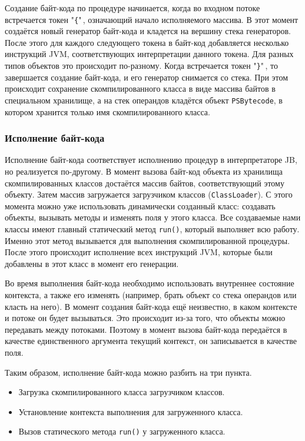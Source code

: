 \documentclass[14pt]{extarticle}
\begin{document}
	Создание байт-кода по процедуре начинается, когда во входном потоке встречается токен "\texttt{\{}"\,, означающий начало исполняемого массива. В этот момент создаётся новый генератор байт-кода и кладется на вершину стека генераторов. После этого для каждого следующего токена в байт-код добавляется несколько инструкций JVM, соответствующих интерпретации данного токена. Для разных типов объектов это происходит по-разному. Когда встречается токен "\texttt{\}}"\,, то завершается создание байт-кода, и его генератор снимается со стека. При этом происходит сохранение скомпилированного класса в виде массива байтов в специальном хранилище, а на стек операндов кладётся объект \texttt{PSBytecode}, в котором хранится только имя скомпилированного класса. 
	\subsubsection*{Исполнение байт-кода}
	Исполнение байт-кода соответствует исполнению процедур в интерпретаторе JB, но реализуется по-другому. В момент вызова байт-код объекта из хранилища скомпилированных классов достаётся массив байтов, соответствующий этому объекту. Затем массив загружается загрузчиком классов (\texttt{ClassLoader}). С этого момента можно уже использовать динамически созданный класс: создавать объекты, вызывать методы и изменять поля у этого класса. Все создаваемые нами классы имеют главный статический метод \texttt{run()}, который выполняет всю работу. Именно этот метод вызывается для выполнения скомпилированной процедуры. После этого происходит исполнение всех инструкций JVM, которые были добавлены в этот класс в момент его генерации.
	
	Во время выполнения байт-кода необходимо использовать внутреннее состояние контекста, а также его изменять (например, брать объект со стека операндов или класть на него). В момент создания байт-кода ещё неизвестно, в каком контексте и потоке он будет вызываться. Это происходит из-за того, что объекты можно передавать между потоками. Поэтому в момент вызова байт-кода передаётся в качестве единственного аргумента текущий контекст, он записывается в качестве поля.
	
	Таким образом, исполнение байт-кода можно разбить на три пункта.
	\begin{itemize}
		\item Загрузка скомпилированного класса загрузчиком классов.
		\item Установление контекста выполнения для загруженного класса.
		\item Вызов статического метода \texttt{run()} у загруженного класса.
	\end{itemize}
\end{document}
